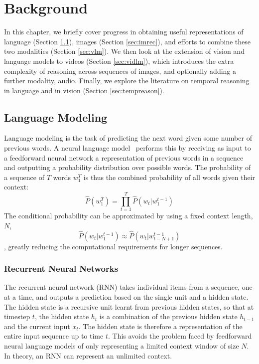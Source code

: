 
\chapter{Background}
\label{chap:bg}

In this chapter, we briefly cover progress in obtaining useful representations
of language (Section \ref{sec:lm}), images (Section \ref{sec:imrec}), and
efforts to combine these two modalities (Section \ref{sec:vlm}). We then
look at the extension of vision and language models to videos (Section
\ref{sec:vidlm}), which introduces the extra complexity of reasoning across
sequences of images, and optionally adding a further modality, audio. Finally,
we explore the literature on temporal reasoning in language and in vision
(Section \ref{sec:tempreason}).

\section{Language Modeling}
\label{sec:lm}

Language modeling is the task of predicting the next word given some number of
previous words. A neural language model~\citep{bengio2003nlm} performs this by
receiving as input to a feedforward neural network a representation of previous
words in a sequence and outputting a probability distribution over possible
words. The probability of a sequence of $T$ words $w_1^T$ is thus the
combined probability of all words given their context:
$$\hat{P}(w_1^T)=\prod_{t=1}^{T}\hat{P}(w_t|w_1^{t-1})$$
The conditional probability can be approximated by using a fixed context
length, $N$, $$\hat{P}(w_t|w_1^{t-1})\approx\hat{P}(w_t|w_{t-N+1}^{t-1})$$,
greatly reducing the computational requirements for longer sequences.

\subsection{Recurrent Neural Networks}
\label{ssec:rnn}

The recurrent neural network (RNN) takes individual items from a sequence, one
at a time, and outputs a prediction based on the single unit and a hidden
state.  The hidden state is a recursive unit learnt from previous hidden
states, so that at timestep $t$, the hidden state $h_t$ is a combination of the
previous hidden state $h_{t-1}$ and the current input $x_t$. The hidden state
is therefore a representation of the entire input sequence up to time $t$. This
avoids the problem faced by feedforward neural language models of only
representing a limited context window of size $N$. In theory, an RNN can
represent an unlimited context.

